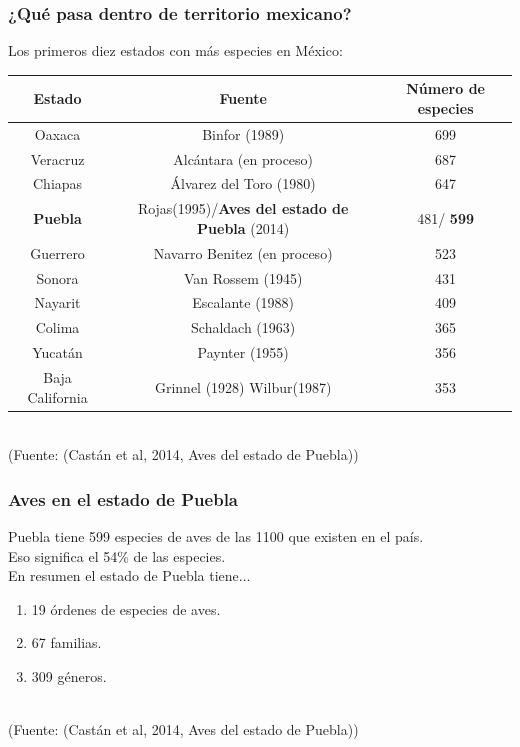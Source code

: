 \documentclass[compress]{beamer}
\begin{document}
{
  \begin{frame}
    \frametitle{¿Qué pasa dentro de territorio mexicano?}
    \begin{center}
      Los primeros diez estados con más especies en México: \\[0.2cm]
      {\tiny
	\begin{tabular}{ccc} \toprule
	  Estado & Fuente & Número de especies \\ \midrule
	  Oaxaca & Binfor (1989) & 699 \\[0.2cm]
	  Veracruz & Alcántara (en proceso) & 687 \\ [0.2cm]
	  Chiapas & Álvarez del Toro (1980) & 647 \\ [0.2cm]
	  \textbf{Puebla} & Rojas(1995)/\textbf{Aves del estado de Puebla} (2014) & 481/ \textbf{599} \\ [0.2cm]
	  Guerrero & Navarro Benitez (en proceso) & 523 \\ [0.2cm]
	  Sonora & Van Rossem (1945) & 431 \\ [0.2cm]
	  Nayarit & Escalante (1988) & 409 \\ [0.2cm]
	  Colima & Schaldach (1963) & 365 \\ [0.2cm]
	  Yucatán & Paynter (1955) & 356 \\ [0.2cm]
	  Baja California & Grinnel (1928) Wilbur(1987) & 353 \\ \hline
	  \end{tabular}}
    \end{center}\\[0.2cm]
    
    \tiny(Fuente: (Castán et al, 2014, Aves del estado de Puebla))

 \end{frame}
}

{
  \begin{frame}
    \frametitle{Aves en el estado de  Puebla}
    \begin{center}
      Puebla tiene 599 especies de aves de las 1100 que existen en el país.\\
      Eso significa el 54\% de las especies.\\
      En resumen el estado de Puebla tiene...\\
    \end{center}
    \begin{enumerate}
     \item 19 órdenes de especies de aves.\\ [0.2cm]
     \item 67 familias.\\ [0.2cm]
     \item 309 géneros. \\ [0.2cm]
    \end{enumerate} \\[0.2cm]
    
    \tiny(Fuente: (Castán et al, 2014, Aves del estado de Puebla))
 \end{frame}
}
\end{document}
